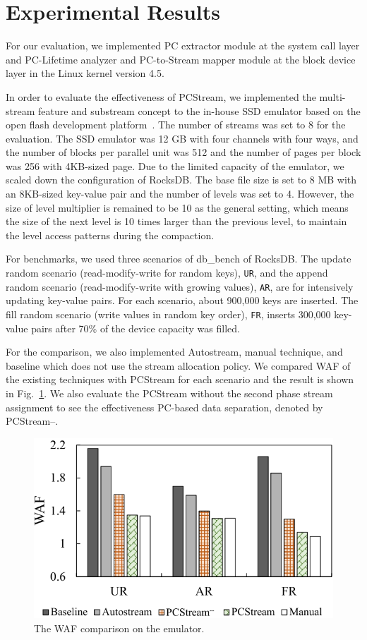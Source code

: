 \section{Experimental Results}
For our evaluation, we implemented PC extractor module at the 
system call layer 
and PC-Lifetime analyzer and PC-to-Stream mapper module 
at the block device layer in the Linux kernel version 4.5.

In order to evaluate the effectiveness of {\sf PCStream},
we implemented the multi-stream feature and substream concept
to the in-house SSD emulator
based on the open flash development platform~\cite{AMF}.
The number of streams was set to 8 for the evaluation.
The SSD emulator was 12 GB with four channels with four ways, and 
the number of blocks per parallel unit was 512 and
the number of pages per block was 256 with 4KB-sized page.
Due to the limited capacity of the emulator, 
we scaled down the configuration of RocksDB.
The base file size is set to 8 MB
with an 8KB-sized key-value pair and the number of levels was set to 4.
However, the size of level multiplier is remained to be 10 as the general setting,
which means the size of the next level is 10 times larger than the previous level,
to maintain the level access patterns during the compaction.

For benchmarks, we used three scenarios of db\_bench of RocksDB.
The update random scenario (read-modify-write for random keys), {\tt UR}, and 
the append random scenario (read-modify-write with growing values), {\tt AR}, are
for intensively updating key-value pairs.
For each scenario, about 900,000 keys are inserted.
The fill random scenario (write values in random key order), {\tt FR}, 
inserts 300,000 key-value pairs 
after 70\% of the device capacity was filled.

For the comparison, 
we also implemented Autostream, manual technique, and
baseline which does not use the stream allocation policy.
We compared WAF of the existing techniques with {\sf PCStream}
for each scenario and the result is shown in Fig.~\ref{fig:result_emul}. 
We also evaluate the {\sf PCStream} without the second phase stream
assignment to see the effectiveness PC-based data separation, 
denoted by {\sf PCStream--}.

\begin{figure}[t]
	\centering
	\includegraphics[width=0.8\linewidth]{figure/result_emul}
	\vspace{-10pt}
	\caption{The WAF comparison on the emulator.}
	\label{fig:result_emul}
	\vspace{-15pt}
\end{figure}

